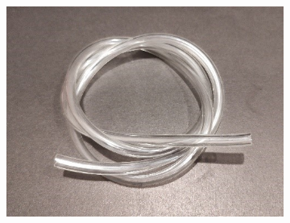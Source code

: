 \documentclass[twoside]{article}
\begin{document}
\begin{figure}[H]
\begin{subfigure}[b]{0.33\linewidth}
	\end{subfigure}%
	\begin{subfigure}[b]{0.33\linewidth}
		\centering
		\includegraphics[width=\textwidth]{pvc_tubing}
	\end{subfigure}
	

\end{figure}
\end{document}

